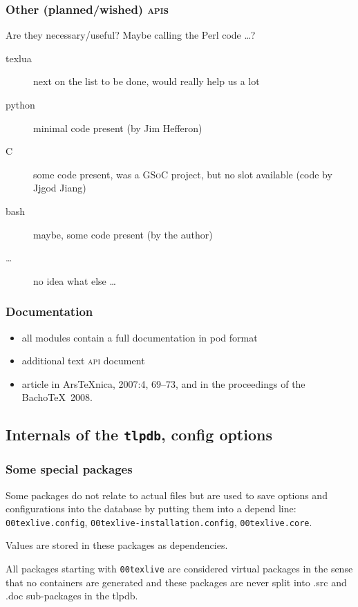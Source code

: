 \documentclass{beamer}
\newcommand{\tlpdb}{\texttt{tlpdb}}
\def\bigit{\\[\bigskipamount]}
\begin{document}
\begin{frame}
  \frametitle{Other (planned/wished) \textsc{api}s}
  Are they necessary/useful? Maybe calling the Perl code \ldots?
  \begin{description}
  \item[texlua] next on the list to be done, would really help us a lot
  \item[python] minimal code present (by Jim Hefferon)
  \item[C] some code present, was a \textsc{GSoC} project, but no slot
    available (code by Jjgod Jiang)
  \item[bash] maybe, some code present (by the author)
  \item[\ldots] no idea what else \ldots
  \end{description}
\end{frame}

\begin{frame}
  \frametitle{Documentation}
  \begin{itemize}
  \item all modules contain a full documentation in pod format\bigit
  \item additional text \textsc{api} document\bigit
  \item article in Ars\TeX nica, 2007:4, 69--73, and in the
    proceedings of the Bacho\TeX~2008.
  \end{itemize}
\end{frame}


\subsection{Internals of the \tlpdb, config options}

\begin{frame}
  \frametitle{Some special packages}
  Some packages do not relate to actual files but are used to save
  options and configurations into the database by putting them into a
  depend line: \texttt{00texlive.config},
  \texttt{00texlive-installation.config},
  \texttt{00texlive.core}.

  Values are stored in these packages as dependencies.

  All packages starting with \texttt{00texlive} are considered virtual
  packages in the sense that no containers are generated and these
  packages are never split into .src and .doc sub-packages in the
  tlpdb. 
\end{frame}
\end{document}
